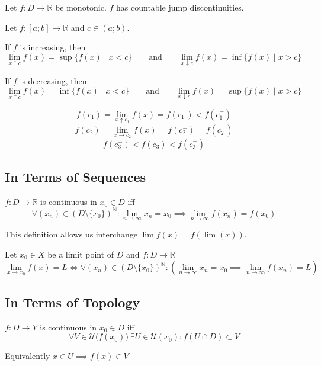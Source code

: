 \begin{theorem}
   Let \(f:D \to \mathbb{R}\) be monotonic. \(f\) has countable jump discontinuities.
\end{theorem}

\begin{proposition}\label{pro:one_sided_lim_incr}
   Let \(f: [a; b] \to \mathbb{R}\) and \(c \in (a; b)\).

   If \(f\) is increasing, then
   \[\lim_{x \uparrow c} f(x) = \sup\{f(x) \mid x < c\} \qquad\text{and}\qquad \lim_{x \downarrow c} f(x) = \inf\{f(x) \mid x > c\}\]

   If \(f\) is decreasing, then
   \[\lim_{x \uparrow c} f(x) = \inf\{f(x) \mid x < c\} \qquad\text{and}\qquad \lim_{x \downarrow c} f(x) = \sup\{f(x) \mid x > c\}\]
\end{proposition}
\begin{example}
   \[f(c_1) = \lim_{x \uparrow c_1} f(x) = f(c_1^-) < f(c_1^+)\]
   \[f(c_2) = \lim_{x \to c_2} f(x) = f(c_2^-) = f(c_2^+)\]
   \[f(c_3^-) < f(c_3) < f(c_3^+)\]
\end{example}
\begin{center}
   
\end{center}

\subsection{In Terms of Sequences}
\begin{definition}\label{def:seq_cont}
   \(f: D \to \mathbb{R}\) is continuous in \(x_0 \in D\) iff
   \[\forall (x_n) \in (D\setminus\{x_0\})^\mathbb{N}: \lim_{n \to \infty} x_n = x_0 \implies \lim_{n \to \infty} f(x_n) = f(x_0)\]
\end{definition}
\begin{remark}
   This definition allows us interchange \(\lim f(x) = f(\lim(x))\).
\end{remark}

\begin{proposition}[Function Limit = Sequence Limit]
   Let \(x_0 \in X\) be a limit point of \(D\) and \(f: D \to \mathbb{R}\)
   \[\lim_{x \to x_0} f(x) = L \iff \forall (x_n) \in (D\setminus\{x_0\})^\mathbb{N}: \left(\lim_{n \to \infty} x_n = x_0 \implies  \lim_{n \to \infty} f(x_n) = L\right)\]
\end{proposition}

\subsection{In Terms of Topology}
\begin{definition}\label{def:neigh_cont}
   \(f: D \to Y\) is continuous in \(x_0 \in D\) iff
   \[\forall V \in \mathcal{U}\big(f(x_0)\big)~\exists U \in \mathcal{U}(x_0): f(U \cap D) \subset V\]
\end{definition}
\begin{remark}
   Equivalently \(x \in U \implies f(x) \in V\)
\end{remark}

